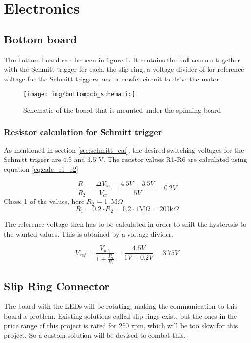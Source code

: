 \section{Electronics}

\subsection{Bottom board}
The bottom board can be seen in figure \ref{fig:botm_schematic}.
It contains the hall sensors together with the Schmitt trigger for each, the slip ring, a voltage divider of for reference voltage for the Schmitt triggers, and a mosfet circuit to drive the motor. 
\begin{figure}[h]
 \centering
 \texttt{[image: img/bottompcb\_schematic]}
 \caption{Schematic of the board that is mounted under the spinning board}
 \label{fig:botm_schematic}
\end{figure}

\subsubsection*{Resistor calculation for Schmitt trigger}
As mentioned in section \ref{sec:schmitt_cal}, the desired switching voltages for the Schmitt trigger are 4.5 and 3.5 V.
The resistor values R1-R6 are calculated using equation \ref{eq:calc_r1_r2}\cite{book:prac_ele}

\begin{equation}\label{eq:calc_r1_r2}
 \frac{R_1}{R_2} = \frac{\Delta V_{in}}{V_{cc}} = \frac{4.5V-3.5V}{5V} = 0.2V
\end{equation}
Chose 1 of the values, here $R_2$ = 1\ M$\Omega$
\begin{equation}
 R_1 = 0.2\cdot R_2 = 0.2\cdot 1 \text{M} \Omega = 200 \text{k}\Omega
\end{equation}

The reference voltage then has to be calculated in order to shift the hysteresis to the wanted values.
This is obtained by a voltage divider.

\begin{equation}
 V_{ref} = \frac{V_{in1}}{1+\frac{R_1}{R_2}} = \frac{4.5V}{1V+0.2V} = 3.75 V
\end{equation}

\subsection{Slip Ring Connector}\label{sec:ring_connector}
The board with the LEDs will be rotating, making the communication to this board a problem.
Existing solutions called slip rings exist, but the ones in the price range of this project is rated for 250 rpm, which will be too slow for this project.
So a custom solution will be devised to combat this.


